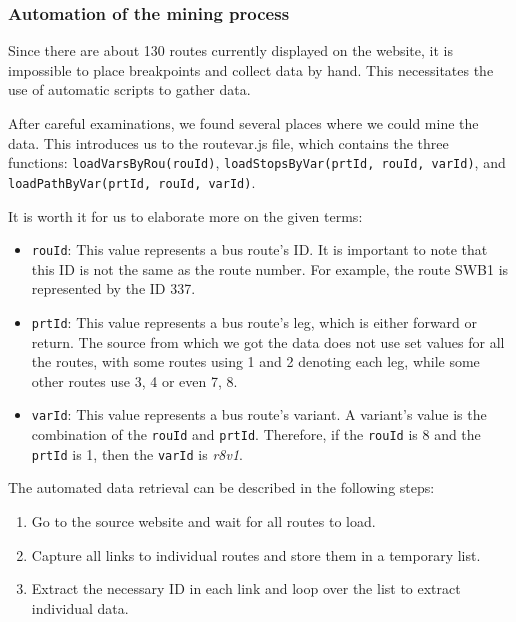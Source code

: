 \subsubsection{Automation of the mining process}

Since there are about 130 routes currently displayed on the website, it is impossible to place breakpoints and collect data by hand. This necessitates the use of automatic scripts to gather data.

After careful examinations, we found several places where we could mine the data. This introduces us to the routevar.js file, which contains the three functions: \lstinline{loadVarsByRou(rouId)}, \lstinline{loadStopsByVar(prtId, rouId, varId)}, and \lstinline{loadPathByVar(prtId, rouId, varId)}.

It is worth it for us to elaborate more on the given terms:
\begin{itemize}
    \item \lstinline{rouId}: This value represents a bus route's ID. It is important to note that this ID is not the same as the route number. For example, the route SWB1 is represented by the ID 337. 
    \item \lstinline{prtId}: This value represents a bus route's leg, which is either forward or return. The source from which we got the data does not use set values for all the routes, with some routes using 1 and 2 denoting each leg, while some other routes use 3, 4 or even 7, 8. 
    \item \lstinline{varId}: This value represents a bus route's variant. A variant's value is the combination of the \lstinline{rouId} and \lstinline{prtId}. Therefore, if the \lstinline{rouId} is 8 and the \lstinline{prtId} is 1, then the \lstinline{varId} is \textit{r8v1}.
\end{itemize}

The automated data retrieval can be described in the following steps:
\begin{enumerate}
    \item Go to the source website and wait for all routes to load.
    \item Capture all links to individual routes and store them in a temporary list.
    \item Extract the necessary ID in each link and loop over the list to extract individual data.
\end{enumerate}

